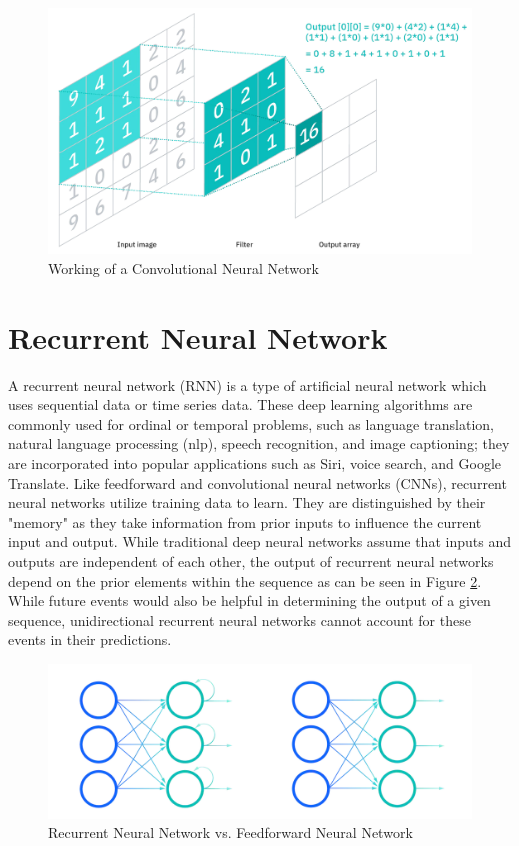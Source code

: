 \begin{figure}[H]
\centering
\includegraphics[width=\textwidth]{imgs/cnn.png}
\caption{Working of a Convolutional Neural Network}
\label{fig: cnn}
\end{figure}
\section{Recurrent Neural Network}
A recurrent neural network (RNN) is a type of artificial neural network which uses sequential data or time series data. These deep learning algorithms are commonly used for ordinal or temporal problems, such as language translation, natural language processing (nlp), speech recognition, and image captioning; they are incorporated into popular applications such as Siri, voice search, and Google Translate. Like feedforward and convolutional neural networks (CNNs), recurrent neural networks utilize training data to learn. They are distinguished by their "memory" as they take information from prior inputs to influence the current input and output. While traditional deep neural networks assume that inputs and outputs are independent of each other, the output of recurrent neural networks depend on the prior elements within the sequence as can be seen in Figure \ref{fig: rnn}. While future events would also be helpful in determining the output of a given sequence, unidirectional recurrent neural networks cannot account for these events in their predictions.

\begin{figure}[H]
\centering
\includegraphics[width=\textwidth]{imgs/rnn.png}
\caption{Recurrent Neural Network vs. Feedforward Neural Network }
\label{fig: rnn}
\end{figure}
